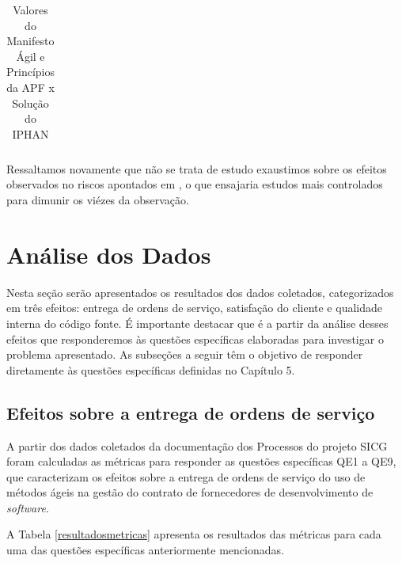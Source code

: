 \begin{table}[H]
\begin{tabular}{|p{6cm}|p{8cm}|}
   \hline
\end{tabular}
\caption{Valores do Manifesto Ágil e Princípios da APF x Solução do IPHAN}
\label{apfiphan}
\end{table}

Ressaltamos novamente que não se trata de estudo exaustimos sobre os efeitos observados no riscos apontados em , o que ensajaria estudos mais controlados para dimunir os viézes da observação.


\section[Análise dos Dados]{Análise dos Dados}

Nesta seção serão apresentados os resultados dos dados coletados, categorizados em três efeitos: entrega de ordens de serviço, satisfação do cliente e qualidade interna do código fonte. É importante destacar que é a partir da análise desses efeitos que responderemos às questões específicas elaboradas para investigar o problema apresentado. As subseções a seguir têm o objetivo de responder diretamente às questões específicas definidas no Capítulo 5.

\subsection[Efeitos sobre a entrega de ordens de serviço]{Efeitos sobre a entrega de ordens de serviço}

A partir dos dados coletados da documentação dos Processos do projeto SICG foram calculadas as métricas para responder as questões específicas QE1 a QE9, que caracterizam os efeitos sobre a entrega de ordens de serviço do uso de métodos ágeis na gestão do contrato de fornecedores de desenvolvimento de \textit{software}.

A Tabela \ref{resultadosmetricas} apresenta os resultados das métricas para cada uma das questões específicas anteriormente mencionadas.

